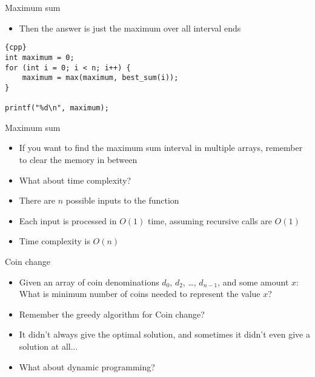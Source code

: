 \begin{frame}[fragile]{Maximum sum}
    \begin{itemize}
        \item Then the answer is just the maximum over all interval ends
    \end{itemize}

    \begin{lstlisting}{cpp}
int maximum = 0;
for (int i = 0; i < n; i++) {
    maximum = max(maximum, best_sum(i));
}

printf("%d\n", maximum);
    \end{lstlisting}
\end{frame}

\begin{frame}[fragile]{Maximum sum}
    \begin{itemize}
        \item If you want to find the maximum sum interval in multiple arrays, remember to clear the memory in between
        \item What about time complexity?
        \item There are $n$ possible inputs to the function
        \item Each input is processed in $O(1)$ time, assuming recursive calls are $O(1)$
        \item Time complexity is $O(n)$
    \end{itemize}
\end{frame}

\begin{frame}[fragile]{Coin change}

    \begin{itemize}
\item Given an array of coin denominations $d_0$, $d_2$, \ldots, $d_{n-1}$,
            and some amount $x$: What is minimum number of coins needed to
            represent the value $x$?

        \item Remember the greedy algorithm for Coin change?
        \item It didn't always give the optimal solution, and sometimes it didn't even give a solution at all...

        \item What about dynamic programming?
    \end{itemize}
\end{frame}

